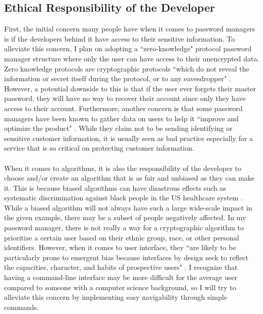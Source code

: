 \documentclass[10pt,twocolumn]{article}
\begin{document}
\subsection{Ethical Responsibility of the Developer}
First, the initial concern many people have when it comes to password managers is if the developers behind it have access to their sensitive information. To alleviate this concern, I plan on adopting a ``zero-knowledge" protocol password manager structure where only the user can have access to their unencrypted data. Zero knowledge protocols are cryptographic protocols ``which do not reveal the information or secret itself during the protocol, or to any eavesdropper" \cite{aronsson1995zero}. However, a potential downside to this is that if the user ever forgets their master password, they will have no way to recover their account since only they have access to their account. Furthermore, another concern is that some password managers have been known to gather data on users to help it ``improve and optimize the product" \cite{porter_2021}. While they claim not to be sending identifying or sensitive customer information, it is usually seen as bad practice especially for a service that is so critical on protecting customer information.
\paragraph{}
When it comes to algorithms, it is also the responsibility of the developer to choose and/or create an algorithm that is as fair and unbiased as they can make it. This is because biased algorithms can have disastrous effects such as systematic discrimination against black people in the US healthcare system \cite{ledford2019millions}. While a biased algorithm will not always have such a large wide-scale impact in the given example, there may be a subset of people negatively affected. In my password manager, there is not really a way for a cryptographic algorithm to prioritize a certain user based on their ethnic group, race, or other personal identifiers. However, when it comes to user interface, they ``are likely to be particularly prone to emergent bias because interfaces by design seek to reflect the capacities, character, and habits of prospective users" \cite{friedman1996bias}. I recognize that having a command-line interface may be more difficult for the average user compared to someone with a computer science background, so I will try to alleviate this concern by implementing easy navigability through simple commands.
\end{document}

